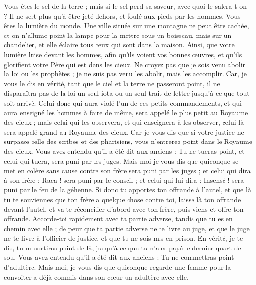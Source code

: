 \begin{multicols}{2}
Vous êtes le sel de la terre ; mais si le sel perd sa saveur, avec quoi le salera-t-on ? Il ne sert plus qu’à être jeté dehors, et foulé aux pieds par les hommes.
Vous êtes la lumière du monde. Une ville située sur une montagne ne peut être cachée,
et on n'allume point la lampe pour la mettre sous un boisseau, mais sur un chandelier, et elle éclaire tous ceux qui sont dans la maison.
Ainsi, que votre lumière luise devant les hommes, afin qu'ils voient vos bonnes œuvres, et qu'ils glorifient votre Père qui est dans les cieux.
Ne croyez pas que je sois venu abolir la loi ou les prophètes ; je ne suis pas venu les abolir, mais les accomplir.
Car, je vous le dis en vérité, tant que le ciel et la terre ne passeront point, il ne disparaîtra pas de la loi un seul iota ou un seul trait de lettre jusqu’à ce que tout soit arrivé.
Celui donc qui aura violé l'un de ces petits commandements, et qui aura enseigné les hommes à faire de même, sera appelé le plus petit au Royaume des cieux ; mais celui qui les observera, et qui enseignera à les observer, celui-là sera appelé grand au Royaume des cieux.
Car je vous dis que si votre justice ne surpasse celle des scribes et des pharisiens, vous n'entrerez point dans le Royaume des cieux.
Vous avez entendu qu'il a été dit aux anciens : Tu ne tueras point, et celui qui tuera, sera puni par les juges.
Mais moi je vous dis que quiconque se met en colère sans cause contre son frère sera puni par les juges ; et celui qui dira à son frère : Raca ! sera puni par le conseil ; et celui qui lui dira : Insensé ! sera puni par le feu de la géhenne{}.
Si donc tu apportes ton offrande à l'autel, et que là tu te souviennes que ton frère a quelque chose contre toi,
laisse là ton offrande devant l'autel, et va te réconcilier d’abord avec ton frère, puis viens et offre ton offrande.
Accorde-toi rapidement avec ta partie adverse, tandis que tu es en chemin avec elle ; de peur que ta partie adverse ne te livre au juge, et que le juge ne te livre à l’officier de justice, et que tu ne sois mis en prison.
En vérité, je te dis, tu ne sortiras point de là, jusqu'à ce que tu n’aies payé le dernier quart de sou.
Vous avez entendu qu'il a été dit aux anciens : Tu ne commettras point d’adultère.
Mais moi, je vous dis que quiconque regarde une femme pour la convoiter a déjà commis dans son cœur un adultère avec elle.

\end{multicols}

